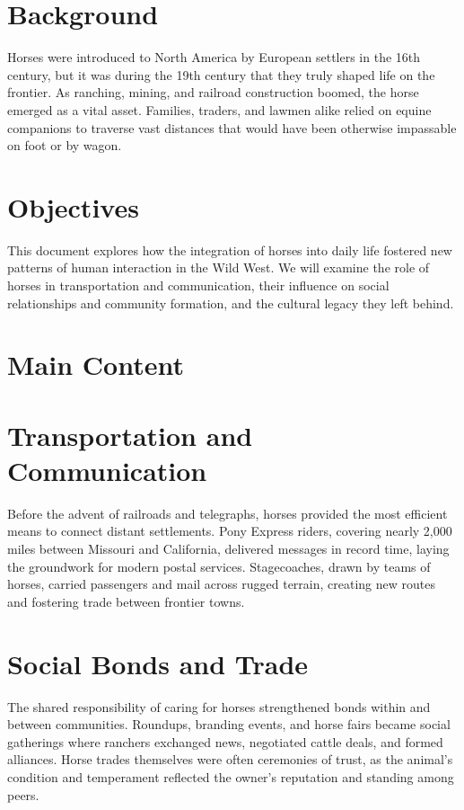 \documentclass[11pt]{report}
\begin{document}
\section{Background}
Horses were introduced to North America by European settlers in the 16th century, but it was during the 19th century that they truly shaped life on the frontier. As ranching, mining, and railroad construction boomed, the horse emerged as a vital asset. Families, traders, and lawmen alike relied on equine companions to traverse vast distances that would have been otherwise impassable on foot or by wagon.

\section{Objectives}
This document explores how the integration of horses into daily life fostered new patterns of human interaction in the Wild West. We will examine the role of horses in transportation and communication, their influence on social relationships and community formation, and the cultural legacy they left behind.

\section{Main Content}

\section{Transportation and Communication}
Before the advent of railroads and telegraphs, horses provided the most efficient means to connect distant settlements. Pony Express riders, covering nearly 2,000 miles between Missouri and California, delivered messages in record time, laying the groundwork for modern postal services. Stagecoaches, drawn by teams of horses, carried passengers and mail across rugged terrain, creating new routes and fostering trade between frontier towns.

\section{Social Bonds and Trade}
The shared responsibility of caring for horses strengthened bonds within and between communities. Roundups, branding events, and horse fairs became social gatherings where ranchers exchanged news, negotiated cattle deals, and formed alliances. Horse trades themselves were often ceremonies of trust, as the animal’s condition and temperament reflected the owner’s reputation and standing among peers.
\end{document}
